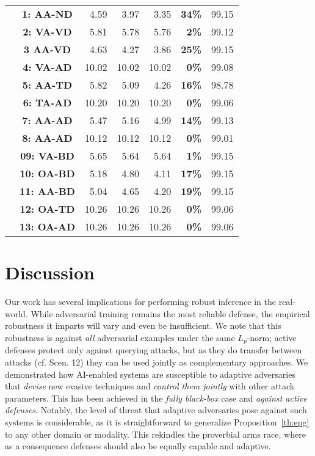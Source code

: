 \begin{table*}[!ht]
\begin{tabular}{c|c|rrrr|r}
      & \raggedright\textbf{1: AA-ND} &  4.59 &  3.97 &  3.35 & \textbf{34\%} & 99.15\\
      & \raggedright\textbf{2: VA-VD} &  5.81 &  5.78 &  5.76 & \textbf{2\%} & 99.12\\
      & \raggedright\textbf{3 AA-VD} &  4.63 &  4.27 &  3.86 & \textbf{25\%} & 99.15 \\
      & \raggedright\textbf{4: VA-AD} & 10.02 & 10.02 & 10.02 & \textbf{0\%} & 99.08\\
      & \raggedright\textbf{5: AA-TD} &  5.82 &  5.09 &  4.26 & \textbf{16\%} & 98.78 \\
      & \raggedright\textbf{6: TA-AD} & 10.20 & 10.20 & 10.20 & \textbf{0\%} & 99.06\\
      & \raggedright\textbf{7: AA-AD} &  5.47 &  5.16 &  4.99 & \textbf{14\%} & 99.13\\
      & \raggedright\textbf{8: AA-AD} & 10.12 & 10.12 & 10.12 & \textbf{0\%} & 99.01 \\
      \cline{2-7}
      & \raggedright\textbf{09: VA-BD} & 5.65 & 5.64 & 5.64 & \textbf{1\%} & 99.15\\
      & \raggedright\textbf{10: OA-BD} & 5.18 & 4.80 & 4.11 & \textbf{17\%} & 99.15 \\
      & \raggedright\textbf{11: AA-BD} & 5.04 & 4.65 & 4.20 & \textbf{19\%} & 99.15 \\
      & \raggedright\textbf{12: OA-TD} & 10.26 & 10.26 & 10.26 & \textbf{0\%} & 99.06\\
      & \raggedright\textbf{13: OA-AD} & 10.26 & 10.26 & 10.26 & \textbf{0\%} & 99.06 \\  
    \bottomrule
  \end{tabular}
  \label{tab:HSJA_resultM}
\end{table*}

\section{Discussion}
\label{sec:discussion}

Our work has several implications for performing robust inference in the real-world.
While adversarial training remains the most reliable defense, the empirical robustness it imparts will vary and even be insufficient.
We note that this robustness is against \emph{all} adversarial examples under the same $L_p$-norm; active defenses protect only against querying attacks, but as they do transfer between attacks (cf. Scen. 12) they can be used jointly as complementary approaches.
We demonstrated how AI-enabled systems are susceptible to adaptive adversaries that \emph{devise} new evasive techniques and \emph{control them jointly} with other attack parameters.
This has been achieved in the \emph{fully black-box} case and \emph{against active defenses}.
Notably, the level of threat that adaptive adversaries pose against such systems is considerable, as it is straightforward to generalize Proposition~\ref{th:epg} to any other domain or modality.
This rekindles the proverbial arms race, where as a consequence defenses should also be equally capable and adaptive.

